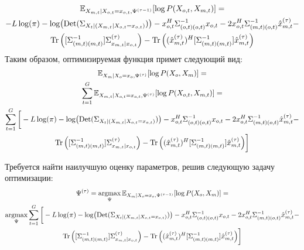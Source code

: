 \documentclass[11pt]{article}
\newcommand{\Expect}{\mathbb{E}}
\DeclareMathOperator*{\argmax}{argmax}
\DeclareMathOperator{\Det}{Det}
\begin{document}
\begin{equation*}
\begin{gathered}
\Expect_{X_{m,t}|X_{o,t}=x_{o,t}, \Psi^{(\tau-1)}}[\log P(X_{o,t}, X_{m,t})]=\\
-L \log(\pi) - \log (\Det(\Sigma_{X_t|(X_{m,t}|X_{o,t}=x_{o,t})})) - x_{o,t}^H \Sigma_{(o,t)(o,t)}^{-1}x_{o,t} - 2 x_{o,t}^H \Sigma_{(m,t)(o,t)}^{-1}\hat{x}_{m,t}^{(\tau)} - \\ \Tr \Big( [\Sigma_{(m,t)(m,t)}^{-1}]\Sigma^{(\tau)}_{x_{m,t}|x_{o,t}} \Big) - \Tr \Big((\hat{x}_{m,t}^{(\tau)})^H[\Sigma_{(m,t)(m,t)}^{-1}]\hat{x}_{m,t}^{(\tau)} \Big) 
\end{gathered}
\end{equation*}
Таким образом, оптимизируемая функция примет следующий вид:
\begin{equation*}
\begin{gathered}
 \Expect_{X_m|X_o=x_o, \Psi^{(\tau)}}[\log P(X_o, X_m)] = \\
 \sum_{t=1}^G\Expect_{X_{m,t}|X_{o,t}=x_{o,t}, \Psi^{(\tau)}}[\log P(X_{o,t}, X_{m,t})] = \\
\sum_{t=1}^G \bigg[-L \log(\pi) - \log (\Det(\Sigma_{X_t|(X_{m,t}|X_{o,t}=x_{o,t})})) - x_{o,t}^H \Sigma_{(o,t)(o,t)}^{-1}x_{o,t} - 2 x_{o,t}^H \Sigma_{(m,t)(o,t)}^{-1}\hat{x}_{m,t}^{(\tau)} - \\ \Tr \Big( [\Sigma_{(m,t)(m,t)}^{-1}]\Sigma^{(\tau)}_{x_{m,t}|x_{o,t}} \Big) - \Tr \Big((\hat{x}_{m,t}^{(\tau)})^H[\Sigma_{(m,t)(m,t)}^{-1}]\hat{x}_{m,t}^{(\tau)} \Big) \bigg]
\end{gathered}
\end{equation*}
\begin{center}
\fontsize{14}{18}\selectfont {}
\end{center}
Требуется найти наилучшую оценку параметров, решив следующую задачу оптимизации:
\begin{equation*}
\begin{gathered}
\Psi^{(\tau)}=\argmax_{\Psi} \Expect_{X_m|X_o=x_o, \Psi^{(\tau-1)}}[\log P(X_o, X_m)] =\\
\argmax_{\Psi} \sum_{t=1}^G \bigg[-L \log(\pi) - \log (\Det(\Sigma_{X_t|(X_{m,t}|X_{o,t}=x_{o,t})})) - x_{o,t}^H \Sigma_{(o,t)(o,t)}^{-1}x_{o,t} - 2 x_{o,t}^H \Sigma_{(m,t)(o,t)}^{-1}\hat{x}_{m,t}^{(\tau)} - \\ \Tr \Big( [\Sigma_{(m,t)(m,t)}^{-1}]\Sigma^{(\tau)}_{x_{m,t}|x_{o,t}} \Big) - \Tr \Big((\hat{x}_{m,t}^{(\tau)})^H[\Sigma_{(m,t)(m,t)}^{-1}]\hat{x}_{m,t}^{(\tau)} \Big) \bigg]
\end{gathered}
\end{equation*}
\end{document}
